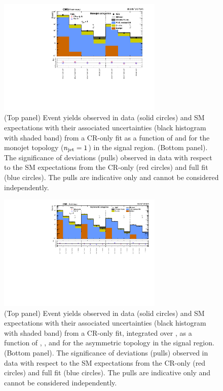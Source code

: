 \begin{figure}[!tb]
  \begin{center}
    \includegraphics[width=0.7\textwidth]{summaryPlot_Monojet_prefit_overlay_fit_b}
    \caption{(Top panel) Event yields observed in data (solid circles)
      and SM expectations with their associated uncertainties (black
      histogram with shaded band) from a CR-only fit as a function of
      \nb and \scalht for the monojet topology ($n_{\mathrm{jet}} = 1$) in the
      signal region. (Bottom panel). The significance of deviations
      (pulls) observed in data with respect to the SM expectations
      from the CR-only (red circles) and full fit (blue circles). The
      pulls are indicative only and cannot be considered
      independently.}
    \label{fig:mono}
  \end{center}
\end{figure}

\begin{figure}[!tb]
  \begin{center}
    \includegraphics[width=0.7\textwidth]{summaryPlot_Asymmetric_prefit_overlay_fit_b}
    \caption{(Top panel) Event yields observed in data (solid circles)
      and SM expectations with their associated uncertainties (black
      histogram with shaded band) from a CR-only fit, integrated over
      \mht, as a function of \njet, \nb, and \scalht for the
      asymmetric topology in the signal region. (Bottom panel). The
      significance of deviations (pulls) observed in data with respect
      to the SM expectations from the CR-only (red circles) and full
      fit (blue circles). The pulls are indicative only and cannot be
      considered independently.}
    \label{fig:asym}
  \end{center}
\end{figure}


